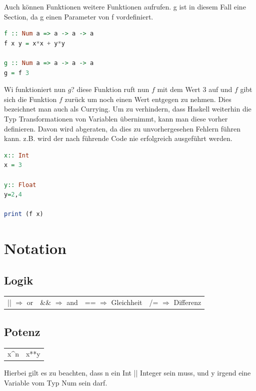 Auch können Funktionen weitere Funktionen aufrufen. g ist in diesem Fall eine Section, da g einen Parameter von f vordefiniert. 
\newline
\begin{lstlisting}[language=Haskell]  
f :: Num a => a -> a -> a 
f x y = x*x + y*y

g :: Num a => a -> a -> a 
g = f 3
\end{lstlisting}
\qquad\newline

Wi funktioniert nun $g$? diese Funktion ruft nun $f$ mit dem Wert 3 auf und $f$ gibt sich die Funktion $f$ zurück um noch einen Wert entgegen zu nehmen. Dies bezeichnet man auch als Currying. 
Um zu verhindern, dass Haskell weiterhin die Typ Transformationen von Variablen übernimmt, kann man diese vorher definieren. Davon wird abgeraten, da dies zu unvorhergesehen Fehlern führen kann. z.B. wird der nach führende Code nie erfolgreich ausgeführt werden. 
\newline
\begin{lstlisting}[language=Haskell]  
x:: Int
x = 3

y:: Float
y=2,4

print (f x)
\end{lstlisting}
\qquad\newline

\section{Notation}
\subsection{Logik}

\begin{tabular}{cccc}
|| $\Rightarrow$ or 	& \&\& $\Rightarrow$ and  & ==  $\Rightarrow$ Gleichheit & /= $\Rightarrow$ Differenz  \\ 
\end{tabular} 

\subsection{Potenz}
\begin{tabular}{cc}
 x\^{}n & x**y \\  
\end{tabular} 

Hierbei gilt es zu beachten, dass n ein Int || Integer sein muss, und y irgend eine Variable vom Typ Num sein darf. 


